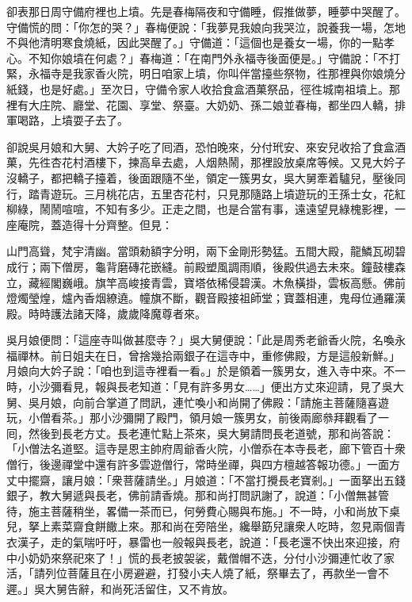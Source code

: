 卻表那日周守備府裡也上墳。先是春梅隔夜和守備睡，假推做夢，睡夢中哭醒了。{}守備慌的問：「你怎的哭？」春梅便說：「我夢見我娘向我哭泣，說養我一場，怎地不與他清明寒食燒紙，因此哭醒了。」守備道：「這個也是養女一場，你的一點孝心。不知你娘墳在何處？」春梅道：「在南門外永福寺後面便是。」守備說：「不打緊，永福寺是我家香火院，明日咱家上墳，你叫伴當擡些祭物，徃那裡與你娘燒分紙錢，也是好處。」至次日，守備令家人收拾食盒酒菓祭品，徑徃城南祖墳上。那裡有大庄院、廳堂、花園、享堂、祭臺。大奶奶、孫二娘並春梅，都坐四人轎，排軍喝路，上墳耍子去了。

卻說吳月娘和大舅、大妗子吃了囘酒，恐怕晚來，分付玳安、來安兒收拾了食盒酒菓，先徃杏花村酒樓下，揀高阜去處，人烟熱鬧，那裡設放桌席等候。又見大妗子沒轎子，都把轎子擡着，後面跟隨不坐，領定一簇男女，吳大舅牽着驢兒，壓後同行，踏青遊玩。三月桃花店，五里杏花村，只見那隨路上墳遊玩的王孫士女，花紅柳綠，鬧鬧喧喧，不知有多少。正走之間，也是合當有事，遠遠望見綠槐影裡，一座庵院，蓋造得十分齊整。但見：

\begin{myquote}
山門高聳，梵宇清幽。當頭勑額字分明，兩下金剛形勢猛。五間大殿，龍鱗瓦砌碧成行；兩下僧房，龜背磨磚花嵌縫。前殿塑風調雨順，後殿供過去未來。鐘鼓樓森立，藏經閣巍峨。旗竿高峻接青雲，寶塔依稀侵碧漢。木魚橫掛，雲板高懸。佛前燈燭瑩煌，爐內香烟繚遶。幢旗不斷，觀音殿接祖師堂；寶蓋相連，鬼母位通羅漢殿。時時護法諸天降，歲歲降魔尊者來。
\end{myquote}

吳月娘便問：「這座寺叫做甚麼寺？」吳大舅便說：「此是周秀老爺香火院，名喚永福禪林。前日姐夫在日，曾捨幾拾兩銀子在這寺中，重修佛殿，方是這般新鮮。」月娘向大妗子說：「咱也到這寺裡看一看。」於是領着一簇男女，進入寺中來。不一時，小沙彌看見，報與長老知道：「見有許多男女……」便出方丈來迎請，見了吳大舅、吳月娘，向前合掌道了問訊，連忙喚小和尚開了佛殿：「請施主菩薩隨喜遊玩，小僧看茶。」那小沙彌開了殿門，領月娘一簇男女，前後兩廊叅拜觀看了一囘，然後到長老方丈。長老連忙點上茶來，吳大舅請問長老道號，那和尚答說：「小僧法名道堅。這寺是恩主帥府周爺香火院，小僧忝在本寺長老，廊下管百十衆僧行，後邊禪堂中還有許多雲遊僧行，常時坐禪，{}與四方檀越答報功德。」一面方丈中擺齋，讓月娘：「衆菩薩請坐。」月娘道：「不當打攪長老寶剎。」一面拏出五錢銀子，教大舅遞與長老，佛前請香燒。那和尚打問訊謝了，說道：「小僧無甚管待，施主菩薩稍坐，畧備一茶而已，何勞費心賜與布施。」不一時，小和尚放下桌兒，拏上素菜齋食餅饊上來。那和尚在旁陪坐，纔舉筯兒讓衆人吃時，忽見兩個青衣漢子，走的氣喘吁吁，暴雷也一般報與長老，說道：「長老還不快出來迎接，府中小奶奶來祭祀來了！」慌的長老披袈裟，戴僧帽不迭，分付小沙彌連忙收了家活，「請列位菩薩且在小房避避，打發小夫人燒了紙，祭畢去了，再款坐一會不遲。」吳大舅告辭，和尚死活留住，又不肯放。

